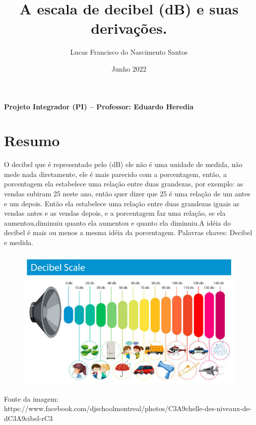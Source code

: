 \title{A escala de decibel (dB) e suas derivações.}
\author{Lucas Francisco do Nascimento Santos}


\date{Junho 2022}



\maketitle

\textbf{ Projeto Integrador (PI) – Professor: Eduardo Heredia }
\
\section{Resumo}
	O decibel que é representado pelo (dB) ele não é uma unidade de medida, não mede nada diretamente, ele é mais parecido com a porcentagem, então, a porcentagem ela estabelece uma relação entre duas grandezas, por exemplo: as vendas subiram 25 neste ano, então quer dizer que 25 é uma relação de um antes e um depois. Então ela estabelece uma relação entre duas grandezas iguais as vendas antes e as vendas depois, e a porcentagem faz uma relação, se ela aumentou,diminuiu quanto ela aumentou e quanto ela diminuiu.A idéia do decibel é mais ou menos a mesma idéia da porcentagem.
	Palavras chaves: Decibel e medida.
	\newline
	
	\begin{figure}[h]
    \centering
    \includegraphics[width = 14cm]{istockphoto-1392255747-612x612.jpg}
    \label{fig:my_label}
    \end{figure}
	
	Fonte da imagem: https://www.facebook.com/djschoolmontreal/photos/C3A9chelle-des-niveaux-de-dC3A9cibel-rC3%
	
